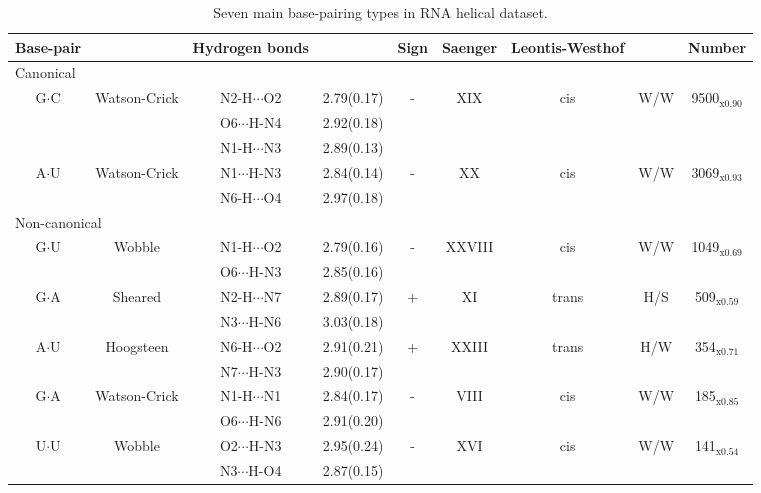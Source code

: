 \begin{table}
\begin{center}
\begin{tabular}{|c c|c c|c|c|c c|c|}
\hline
Base-pair & & Hydrogen bonds &  & Sign & Saenger & Leontis-Westhof & &
Number \\
\hline
\hline
\multicolumn{9}{|l|}{Canonical} \\
\hline
G$\cdot$C & Watson-Crick & N2-H$\cdots$O2 & 2.79(0.17) & - & XIX & cis
 & W/W & 9500$_{\text{x0.90}}$ \\
 & & O6$\cdots$H-N4 & 2.92(0.18) & & & & &  \\
 & & N1-H$\cdots$N3 & 2.89(0.13) & & & & &  \\
\hline
A$\cdot$U & Watson-Crick & N1$\cdots$H-N3 & 2.84(0.14) & - & XX & cis
& W/W & 3069$_{\text{x0.93}}$ \\
 & & N6-H$\cdots$O4 & 2.97(0.18) & & & & &  \\
\hline
\multicolumn{9}{|l|}{Non-canonical} \\
\hline
G$\cdot$U & Wobble & N1-H$\cdots$O2 & 2.79(0.16) & - & XXVIII & cis
 & W/W & 1049$_{\text{x0.69}}$ \\
 & & O6$\cdots$H-N3 & 2.85(0.16) & & & & &  \\
\hline
G$\cdot$A & Sheared & N2-H$\cdots$N7 & 2.89(0.17) & + & XI & trans
 & H/S & 509$_{\text{x0.59}}$ \\
 & & N3$\cdots$H-N6 & 3.03(0.18) & & & & &  \\
\hline
A$\cdot$U & Hoogsteen & N6-H$\cdots$O2 & 2.91(0.21) & + & XXIII & trans
 & H/W & 354$_{\text{x0.71}}$ \\
 & & N7$\cdots$H-N3 & 2.90(0.17) & & & & &  \\
\hline
G$\cdot$A & Watson-Crick & N1-H$\cdots$N1 & 2.84(0.17) & - & VIII & cis
 & W/W & 185$_{\text{x0.85}}$ \\
 & & O6$\cdots$H-N6 & 2.91(0.20) & & & & &  \\
\hline
U$\cdot$U & Wobble & O2$\cdots$H-N3 & 2.95(0.24) & - & XVI & cis
 & W/W & 141$_{\text{x0.54}}$ \\
 & & N3$\cdots$H-O4 & 2.87(0.15) & & & & &  \\
\hline
\end{tabular}
\caption{Seven main base-pairing types in RNA helical dataset.}
\label{tab:seven}
\end{center}  
\end{table}  

